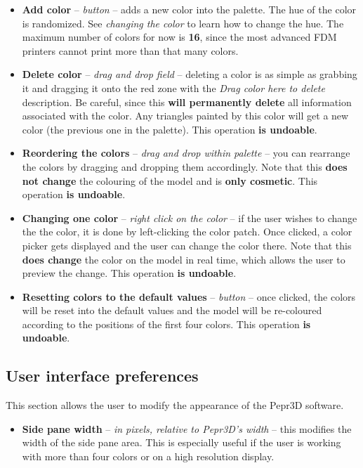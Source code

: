 \begin{itemize}

\item \textbf{Add color} -- \textit{button} -- adds a new color into the palette. The hue of the color is randomized. See \textit{changing the color} to learn how to change the hue. The maximum number of colors for now is \textbf{16}, since the most advanced FDM printers cannot print more than that many colors.

\item \textbf{Delete color} -- \textit{drag and drop field} -- deleting a color is as simple as grabbing it and dragging it onto the red zone with the \textit{Drag color here to delete} description. Be careful, since this \textbf{will permanently delete} all information associated with the color. Any triangles painted by this color will get a new color (the previous one in the palette). This operation \textbf{is undoable}.

\item \textbf{Reordering the colors} -- \textit{drag and drop within palette} -- you can rearrange the colors by dragging and dropping them accordingly. Note that this \textbf{does not change} the colouring of the model and is \textbf{only cosmetic}. This operation \textbf{is undoable}.

\item \textbf{Changing one color} -- \textit{right click on the color} -- if the user wishes to change the the color, it is done by left-clicking the color patch. Once clicked, a color picker gets displayed and the user can change the color there. Note that this \textbf{does change} the color on the model in real time, which allows the user to preview the change. This operation \textbf{is undoable}.

\item \textbf{Resetting colors to the default values } -- \textit{button} -- once clicked, the colors will be reset into the default values and the model will be re-coloured according to the positions of the first four colors. This operation \textbf{is undoable}.

\end{itemize}

\subsection{User interface preferences}

This section allows the user to modify the appearance of the Pepr3D software.

\begin{itemize}

\item \textbf{Side pane width} -- \textit{in pixels, relative to Pepr3D's width} -- this modifies the width of the side pane area. This is especially useful if the user is working with more than four colors or on a high resolution display.

\end{itemize}